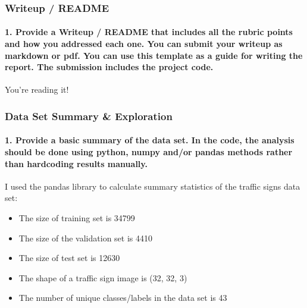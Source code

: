 \documentclass[11pt]{article}
\providecommand{\tightlist}{%
      \setlength{\itemsep}{0pt}\setlength{\parskip}{0pt}}
\begin{document}
    \hypertarget{writeup-readme}{%
\subsubsection{Writeup / README}\label{writeup-readme}}

\hypertarget{provide-a-writeup-readme-that-includes-all-the-rubric-points-and-how-you-addressed-each-one.-you-can-submit-your-writeup-as-markdown-or-pdf.-you-can-use-this-template-as-a-guide-for-writing-the-report.-the-submission-includes-the-project-code.}{%
\paragraph{1. Provide a Writeup / README that includes all the rubric
points and how you addressed each one. You can submit your writeup as
markdown or pdf. You can use this template as a guide for writing the
report. The submission includes the project
code.}\label{provide-a-writeup-readme-that-includes-all-the-rubric-points-and-how-you-addressed-each-one.-you-can-submit-your-writeup-as-markdown-or-pdf.-you-can-use-this-template-as-a-guide-for-writing-the-report.-the-submission-includes-the-project-code.}}

You're reading it!

\hypertarget{data-set-summary-exploration}{%
\subsubsection{Data Set Summary \&
Exploration}\label{data-set-summary-exploration}}

\hypertarget{provide-a-basic-summary-of-the-data-set.-in-the-code-the-analysis-should-be-done-using-python-numpy-andor-pandas-methods-rather-than-hardcoding-results-manually.}{%
\paragraph{1. Provide a basic summary of the data set. In the code, the
analysis should be done using python, numpy and/or pandas methods rather
than hardcoding results
manually.}\label{provide-a-basic-summary-of-the-data-set.-in-the-code-the-analysis-should-be-done-using-python-numpy-andor-pandas-methods-rather-than-hardcoding-results-manually.}}

I used the pandas library to calculate summary statistics of the traffic
signs data set:

\begin{itemize}
\tightlist
\item
  The size of training set is 34799
\item
  The size of the validation set is 4410
\item
  The size of test set is 12630
\item
  The shape of a traffic sign image is (32, 32, 3)
\item
  The number of unique classes/labels in the data set is 43
\end{itemize}
\end{document}
